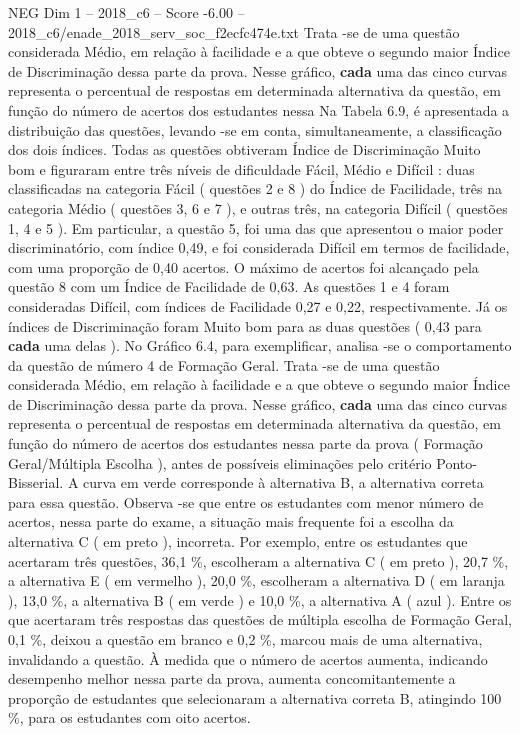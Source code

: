 \begin{textsample}{NEG Dim 1 – 2018\_c6 – Score -6.00 – 2018\_c6/enade\_2018\_serv\_soc\_f2ecfc474e.txt}
Trata -se de uma questão considerada Médio, em relação à facilidade e a que obteve o segundo maior Índice de Discriminação dessa parte da prova.
Nesse gráfico, \textbf{cada} uma das cinco curvas representa o percentual de respostas em determinada alternativa da questão, em função do número de acertos dos estudantes nessa Na Tabela 6.9, é apresentada a distribuição das questões, levando -se em conta, simultaneamente, a classificação dos dois índices.
Todas as questões obtiveram Índice de Discriminação Muito bom e figuraram entre três níveis de dificuldade Fácil, Médio e Difícil : duas classificadas na categoria Fácil ( questões 2 e 8 ) do Índice de Facilidade, três na categoria Médio ( questões 3, 6 e 7 ), e outras três, na categoria Difícil ( questões 1, 4 e 5 ).
Em particular, a questão 5, foi uma das que apresentou o maior poder discriminatório, com índice 0,49, e foi considerada Difícil em termos de facilidade, com uma proporção de 0,40 acertos.
O máximo de acertos foi alcançado pela questão 8 com um Índice de Facilidade de 0,63.
As questões 1 e 4 foram consideradas Difícil, com índices de Facilidade 0,27 e 0,22, respectivamente.
Já os índices de Discriminação foram Muito bom para as duas questões ( 0,43 para \textbf{cada} uma delas ).
No Gráfico 6.4, para exemplificar, analisa -se o comportamento da questão de número 4 de Formação Geral.
Trata -se de uma questão considerada Médio, em relação à facilidade e a que obteve o segundo maior Índice de Discriminação dessa parte da prova.
Nesse gráfico, \textbf{cada} uma das cinco curvas representa o percentual de respostas em determinada alternativa da questão, em função do número de acertos dos estudantes nessa parte da prova ( Formação Geral/Múltipla Escolha ), antes de possíveis eliminações pelo critério Ponto-Bisserial.
A curva em verde corresponde à alternativa B, a alternativa correta para essa questão.
Observa -se que entre os estudantes com menor número de acertos, nessa parte do exame, a situação mais frequente foi a escolha da alternativa C ( em preto ), incorreta.
Por exemplo, entre os estudantes que acertaram três questões, 36,1 \%, escolheram a alternativa C ( em preto ), 20,7 \%, a alternativa E ( em vermelho ), 20,0 \%, escolheram a alternativa D ( em laranja ), 13,0 \%, a alternativa B ( em verde ) e 10,0 \%, a alternativa A ( azul ).
Entre os que acertaram três respostas das questões de múltipla escolha de Formação Geral, 0,1 \%, deixou a questão em branco e 0,2 \%, marcou mais de uma alternativa, invalidando a questão.
À medida que o número de acertos aumenta, indicando desempenho melhor nessa parte da prova, aumenta concomitantemente a proporção de estudantes que selecionaram a alternativa correta B, atingindo 100 \%, para os estudantes com oito acertos.

\end{textsample}
